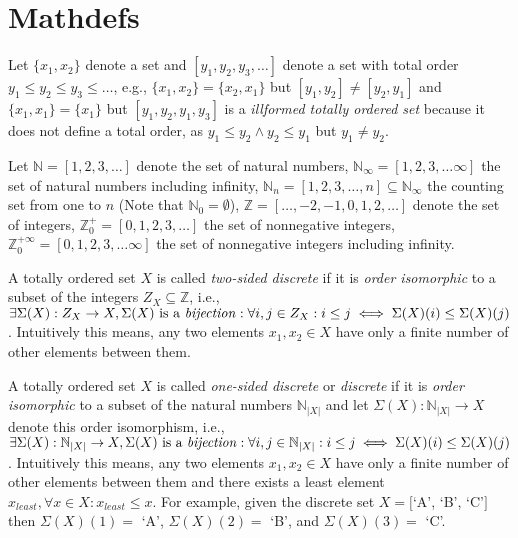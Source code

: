 \chapter{Mathdefs}

Let $\{x_1,x_2\}$ denote a set and $[y_1,y_2,y_3,\ldots]$ denote a set
with total order $y_1 \le y_2 \le y_3 \le \ldots$, e.g., $\{x_1,x_2\} = \{x_2,x_1\}$ but
$[y_1,y_2] \ne [y_2,y_1]$ and $\{x_1,x_1\} = \{x_1\}$ but $[ y_1, y_2, y_1, y_3]$
is a \emph{illformed totally ordered set} because it does not define a total order,
as $y_1 \le y_2 \wedge y_2 \le y_1$ but $y_1 \ne y_2$.

Let $\mathbb{N} = [1,2,3,\ldots]$ denote the set of natural numbers,
$\mathbb{N}_\infty = [1,2,3,\ldots\infty]$ the set of natural numbers including infinity,
$\mathbb{N}_n = [1,2,3,\ldots,n] \subseteq \mathbb{N}_\infty$ the counting set from one to $n$ (Note that $\mathbb{N}_0 = \emptyset$),
$\mathbb{Z} = [\ldots,-2,-1,0,1,2,\ldots]$ denote the set of integers,
$\mathbb{Z}^+_0 = [0,1,2,3,\ldots]$ the set of nonnegative integers,
$\mathbb{Z}^{+\infty}_0 = [0,1,2,3,\ldots\infty]$ the set of nonnegative integers including infinity.

A totally ordered set $X$ is called \emph{two-sided discrete}
if it is \emph{order isomorphic} to a subset of the integers $Z_X \subseteq \mathbb{Z}$,
i.e., $\exists{\Sigma(X): Z_X \to X, \Sigma(X)\textrm{ is a \emph{bijection}}}:
 \forall{i,j \in Z_X}: i \le j \iff \Sigma(X)(i) \le \Sigma(X)(j)$.
Intuitively this means, any two elements
$x_1, x_2 \in X$ have only a finite number of other elements between them.

A totally ordered set $X$ is called \emph{one-sided discrete} or \emph{discrete}
if it is \emph{order isomorphic} to a subset of the natural numbers $\mathbb{N}_{|X|}$
and let $\Sigma(X): \mathbb{N}_{|X|} \to X$ denote this order isomorphism,
i.e., $\exists{\Sigma(X): \mathbb{N}_{|X|} \to X, \Sigma(X)\textrm{ is a \emph{bijection}}}:
 \forall{i,j \in \mathbb{N}_{|X|}}: i \le j \iff \Sigma(X)(i) \le \Sigma(X)(j)$.
Intuitively this means,
any two elements $x_1, x_2 \in X$ have only a finite number of other elements
between them and there exists a least element $x_{least}, \forall{x \in X}: x_{least} \le x$.
For example, given the discrete set $X = [$`A', `B', `C'$]$ then
$\Sigma(X)(1) =$ `A',  $\Sigma(X)(2) =$ `B', and $\Sigma(X)(3) =$ `C'.

